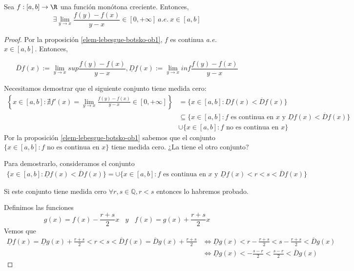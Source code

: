 \begin{nth}
    \label{elem-lebesgue-botsko-th1}
    Sea $f : [a, b] \rightarrow \R$ una función monótona creciente. Entonces, $$\exists \lim_{y \to x} \frac{f(y) - f(x)}{y - x} \in [0, +\infty] \ a.e. \ x \in [a, b]$$
\end{nth}

\begin{proof}
    Por la proposición \ref{elem-lebesgue-botsko-ob1}, $f$ es continua \textit{a.e.} $x \in [a, b]$. Entonces,

    $$\overline{D} f (x) := \lim_{y \to x} sup \frac{f(y) - f(x)}{y -x}, \underline{D} f (x) := \lim_{y \to x} inf \frac{f(y) - f(x)}{y -x}$$

    Necesitamos demostrar que el siguiente conjunto tiene medida cero: \begin{align*}
        \left\{ x \in [a, b] : \nexists f'(x) = \lim_{y \to x} \frac{f(y) - f(x)}{y - x} \in [0, +\infty] \right\} &= \{ x \in [a, b] : \underline{D} f(x) < \overline{D} f(x) \} \\
            & \subseteq \{ x \in [a, b] : f \text{ es continua en } x \text{ y } \underline{D} f(x) < \overline{D} f(x) \} \\
            & \cup \{ x \in [a, b] : f \text{ no es continua en } x \}
    \end{align*}
    Por la proposición \ref{elem-lebesgue-botsko-ob1} sabemos que el conjunto $\{ x \in [a, b] : f \text{ no es continua en } x \}$ tiene medida cero. ¿La tiene el otro conjunto?

    Para demostrarlo, consideramos el conjunto \begin{align*}
        \label{}
        \{ x \in [a, b] : \underline{D} f(x) < \overline{D} f(x) \} = \cup \{ x \in [a, b] : f \text{ es continua en } x \text{ y } \underline{D} f(x) < r < s < \overline{D} f(x) \}
    \end{align*}

    Si este conjunto tiene medida cero $\forall r, s \in \mathbb Q, r < s$ entonces lo habremos probado.

    Definimos las funciones $$g(x) = f(x) - \frac{r+s}{2}x \ \ \ \ y \ \ \ \ f(x) = g(x) + \frac{r+s}{2}x$$
    Vemos que \begin{align*}
        \label{}
        \underline{D} f(x) = \underline{D} g (x) + \frac{r+s}{2} < r < s < \overline{D} f(x) = \overline{D} g(x) + \frac{r+s}{2} &\Leftrightarrow \underline{D} g(x) < r - \frac{r+s}{2} < s - \frac{r+s}{2} < \overline{D} g(x) \\
                                     &\Leftrightarrow \underline{D} g (x) < - \frac{s-r}{2} < \frac{s-r}{2} < \overline{D} g(x)
    \end{align*}


\end{proof}
